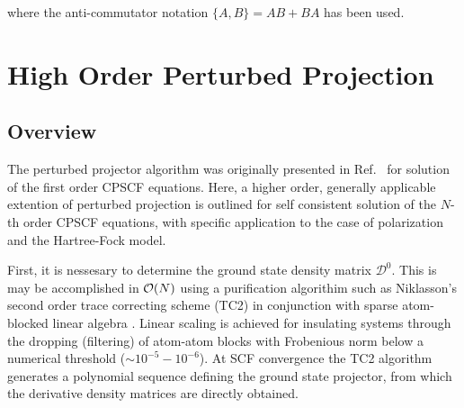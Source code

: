 \documentclass[prl,aps,letterpaper,twocolumn,showpacs,twocolumngrid,superbib]{revtex4}
\def\D{\mathcal{D}}
\begin{document}
where the anti-commutator notation $\{A,B\} = AB+BA$ has been used.

\newpage

\section{High Order Perturbed Projection}

\subsection{Overview}

The perturbed projector algorithm was originally presented in Ref.~
for solution of the first order CPSCF equations.  Here, a higher order, generally applicable 
extention of perturbed projection is outlined for self consistent solution 
of the $N$-th order CPSCF equations, with specific application to the case of polarization and  the
Hartree-Fock  model.  

First, it is nessesary to determine the ground state density matrix $\mathcal{D}^0$.  This is may 
be accomplished in ${\cal O}(N)$ using a purification algorithim such as Niklasson's \cite{ANiklasson02A} 
second order trace correcting scheme (TC2) in conjunction with sparse atom-blocked linear algebra \cite{ANiklasson03,MChallacombe00B}.
Linear scaling is achieved for insulating systems through the dropping (filtering) of atom-atom blocks with Frobenious norm 
below a numerical threshold ($\sim 10^{-5}-10^{-6}$).  At SCF convergence the TC2 algorithm generates a polynomial sequence 
defining the ground state projector, from which the derivative density matrices are directly obtained.
\end{document}
